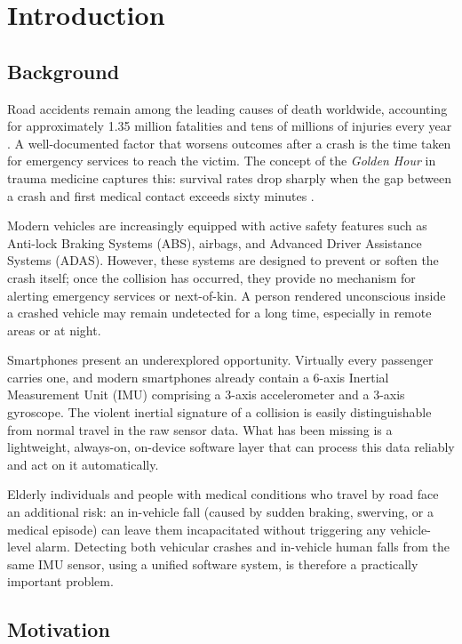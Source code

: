 \chapter{Introduction}

\section{Background}
\label{sec:background}

Road accidents remain among the leading causes of death worldwide, accounting for approximately 1.35 million fatalities and tens of millions of injuries every year \citep{who_road_safety}. A well-documented factor that worsens outcomes after a crash is the time taken for emergency services to reach the victim. The concept of the \textit{Golden Hour} in trauma medicine captures this: survival rates drop sharply when the gap between a crash and first medical contact exceeds sixty minutes \citep{golden_hour}.

Modern vehicles are increasingly equipped with active safety features such as Anti-lock Braking Systems (ABS), airbags, and Advanced Driver Assistance Systems (ADAS). However, these systems are designed to prevent or soften the crash itself; once the collision has occurred, they provide no mechanism for alerting emergency services or next-of-kin. A person rendered unconscious inside a crashed vehicle may remain undetected for a long time, especially in remote areas or at night.

Smartphones present an underexplored opportunity. Virtually every passenger carries one, and modern smartphones already contain a 6-axis Inertial Measurement Unit (IMU) comprising a 3-axis accelerometer and a 3-axis gyroscope. The violent inertial signature of a collision is easily distinguishable from normal travel in the raw sensor data. What has been missing is a lightweight, always-on, on-device software layer that can process this data reliably and act on it automatically.

Elderly individuals and people with medical conditions who travel by road face an additional risk: an in-vehicle fall (caused by sudden braking, swerving, or a medical episode) can leave them incapacitated without triggering any vehicle-level alarm. Detecting both vehicular crashes and in-vehicle human falls from the same IMU sensor, using a unified software system, is therefore a practically important problem.

\section{Motivation}
\label{sec:motivation}

